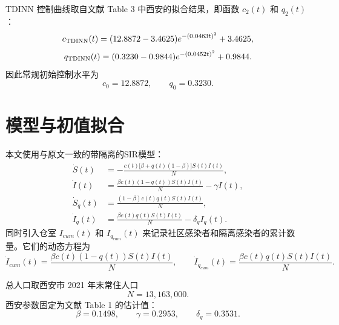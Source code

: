 \documentclass[UTF8,12pt,a4paper]{ctexart}
\numberwithin{equation}{section}
\begin{document}
TDINN 控制曲线取自文献\cite{He2023TDINN} Table 3 中西安的拟合结果，即函数 $c_2(t)$ 和 $q_2(t)$：
\begin{equation}
c_{\rm TDINN}(t)
=
(12.8872-3.4625)e^{-(0.0463t)^2}+3.4625,
\end{equation}
\begin{equation}
q_{\rm TDINN}(t)
=
(0.3230-0.9844)e^{-(0.0452t)^2}+0.9844.
\end{equation}
因此常规初始控制水平为
\begin{equation}
c_0=12.8872,\qquad q_0=0.3230.
\end{equation}

\section{模型与初值拟合}

本文使用与原文一致的带隔离的SIR模型：
\begin{align}
\dot S(t)
&=
-\frac{c(t)\big[\beta+q(t)(1-\beta)\big]S(t)I(t)}{N},\\
\dot I(t)
&=
\frac{\beta c(t)(1-q(t))S(t)I(t)}{N}-\gamma I(t),\\
\dot S_q(t)
&=
\frac{(1-\beta)c(t)q(t)S(t)I(t)}{N},\\
\dot I_q(t)
&=
\frac{\beta c(t)q(t)S(t)I(t)}{N}-\delta_q I_q(t).
\end{align}
同时引入仓室 $I_{cum}(t)$ 和 $I_{q_{cum}}(t)$ 来记录社区感染者和隔离感染者的累计数量。它们的动态方程为
\begin{equation}
\dot I_{cum}(t)=\frac{\beta c(t)(1-q(t))S(t)I(t)}{N},\qquad
\dot I_{q_{cum}}(t)=\frac{\beta c(t)q(t)S(t)I(t)}{N}.
\end{equation}

总人口取西安市 2021 年末常住人口
\begin{equation}
N=13{,}163{,}000.
\end{equation}
西安参数固定为文献\cite{He2023TDINN} Table 1 的估计值：
\begin{equation}
\beta=0.1498,\qquad
\gamma=0.2953,\qquad
\delta_q=0.3531.
\end{equation}
\end{document}
